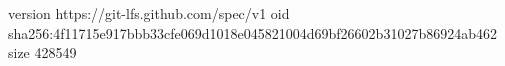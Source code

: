 version https://git-lfs.github.com/spec/v1
oid sha256:4f11715e917bbb33cfe069d1018e045821004d69bf26602b31027b86924ab462
size 428549
